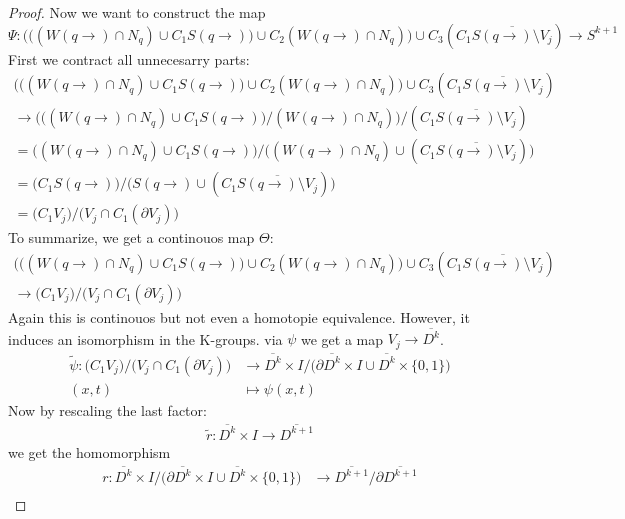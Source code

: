 \begin{proof}
Now we want to construct the map 
\begin{equation}
	\Psi: \Bigg( \Big( (W(q\to )\cap N_q)\cup C_1 S(q\to)\Big)\cup C_2 (W(q\to )\cap N_q)\Bigg)\cup  C_3 (C_1 \overline{S(q\to)\setminus V_j}) \to S^{k+1}
\end{equation}
First we contract all unnecesarry parts: 
\begin{align*}
	\Bigg( \Big( (W(q\to )\cap N_q)\cup C_1 S(q\to)\Big)\cup C_2 (W(q\to )\cap N_q)\Bigg)\cup  C_3 (C_1 \overline{S(q\to)\setminus V_j}) \\
	\to \Bigg( \Big( (W(q\to )\cap N_q)\cup C_1 S(q\to)\Big) \Big/ (W(q\to )\cap N_q)\Bigg) \Big/ (C_1 \overline{S(q\to)\setminus V_j}) \\
	=   \Big( (W(q\to )\cap N_q)\cup C_1 S(q\to)\Big)         \Big/     
	\Big( (W(q\to )\cap N_q) \cup (C_1 \overline{S(q\to)\setminus V_j}) \Big) \\
	= \Big( C_1 S(q\to)  \Big)  \big/   \big( S(q\to ) \cup (C_1 \overline{S(q\to)\setminus V_j}) \big)\\
	= \big( C_1 V_j \big)\big/ \big( V_j \cap C_1(\partial V_j)\big) 
\end{align*}
To summarize, we get a continouos map $\Theta$: 
\begin{align*}
	\Bigg( \Big( (W(q\to )\cap N_q)\cup C_1 S(q\to)\Big)\cup C_2 (W(q\to )\cap N_q)\Bigg)\cup  C_3 (C_1 \overline{S(q\to)\setminus V_j}) \\ 
	\to \big( C_1 V_j \big)\big/ \big( V_j \cap C_1(\partial V_j)\big) 
\end{align*}
Again this is continouos but not even a homotopie equivalence. However, it induces an isomorphism in the K-groups.
via $\psi$ we get a map $V_j\to \overline{D^k}$. 
\begin{align*}
	\tilde{\psi}: \big( C_1 V_j \big)\big/ \big( V_j \cap C_1(\partial V_j)\big)  &\to \overline{D^k}\times I \big/ \big(\partial \overline{D^k}\times I\cup \overline{D^k}\times \{0,1\} \big)\\
	(x,t)					&\mapsto \psi(x,t)
\end{align*}
Now by rescaling the last factor:
\begin{align*}
	\tilde{r}: \overline{D^k}\times I \to \overline{D^{k+1}}
\end{align*} 
we get the homomorphism
\begin{align*}
	r:\overline{D^k}\times I \big/ \big(\partial \overline{D^k}\times I\cup \overline{D^k}\times \{0,1\} \big) 
				&\to \overline{D^{k+1}} \big/ \partial \overline{D^{k+1}}\\

\end{align*}
\end{proof}
